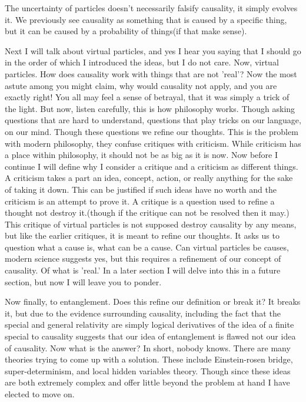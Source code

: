 The uncertainty of particles doesn't necessarily falsify causality, it simply evolves it. We previously see causality as something that is caused by a specific thing, but it can be caused by a probability of things(if that make sense).

Next I will talk about virtual particles, and yes I hear you saying that I should go in the order of which I introduced the ideas, but I do not care. Now, virtual particles. How does causality work with things that are not 'real'? Now the most astute among you might claim, why would causality not apply, and you are exactly right! You all may feel a sense of betrayal, that it was simply a trick of the light. But now, listen carefully, this is how philosophy works. Though asking questions that are hard to understand, questions that play tricks on our language, on our mind. Though these questions we refine our thoughts. This is the problem with modern philosophy, they confuse critiques with criticism. While criticism has a place within philosophy, it should not be as big as it is now. Now before I continue I will define why I consider a critique and a criticism as different things. A criticism takes a part an idea, concept, action, or really anything for the sake of taking it down. This can be justified if such ideas have no worth and the criticism is an attempt to prove it. A critique is a question used to refine a thought not destroy it.(though if the critique can not be resolved then it may.) This critique of virtual particles is not supposed destroy causality by any means, but like the earlier critiques, it is meant to refine our thoughts. It asks us to question what a cause is, what can be a cause. Can virtual particles be causes, modern science suggests yes, but this requires a refinement of our concept of causality. Of what is 'real.' In a later section I will delve into this in a future section, but now I will leave you to ponder.

Now finally, to entanglement. Does this refine our definition or break it? It breaks it, but due to the evidence surrounding causality, including the fact that the special and general relativity are simply logical derivatives of the idea of a finite special to causality suggests that our idea of entanglement is flawed not our idea of causality. Now what is the answer? In short, nobody knows. There are many theories trying to come up with a solution. These include Einstein-rosen bridge, super-determinism, and local hidden variables theory. Though since these ideas are both extremely complex and offer little beyond the problem at hand I have elected to move on.

